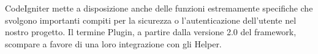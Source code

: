 CodeIgniter mette a disposizione anche delle funzioni estremamente specifiche che svolgono importanti compiti per la sicurezza o l'autenticazione dell'utente nel nostro progetto. Il termine Plugin, a partire dalla versione 2.0 del framework, scompare a favore di una loro integrazione con gli Helper.